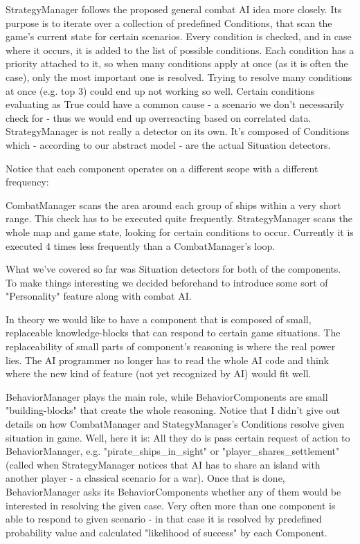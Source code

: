 StrategyManager follows the proposed general combat AI idea more closely. Its purpose is to iterate over a collection of predefined Conditions, that scan the game's current state for certain scenarios.
Every condition is checked, and in case where it occurs, it is added to the list of possible conditions.
Each condition has a priority attached to it, so when many conditions apply at once (as it is often the case), only the most important one is resolved.
Trying to resolve many conditions at once (e.g. top 3) could end up not working so well.
Certain conditions evaluating as True could have a common cause - a scenario we don't necessarily check for - thus we would end up overreacting based on correlated data.
StrategyManager is not really a detector on its own.
It's composed of Conditions which - according to our abstract model - are the actual Situation detectors.

Notice that each component operates on a different scope with a different frequency:

    CombatManager scans the area around each group of ships within a very short range. This check has to be executed quite frequently.
    StrategyManager scans the whole map and game state, looking for certain conditions to occur.
	Currently it is executed 4 times less frequently than a CombatManager's loop.

What we've covered so far was Situation detectors for both of the components.
To make things interesting we decided beforehand to introduce some sort of "Personality" feature along with combat AI.

In theory we would like to have a component that is composed of small, replaceable knowledge-blocks that can respond to certain game situations.
The replaceability of small parts of component's reasoning is where the real power lies.
The AI programmer no longer has to read the whole AI code and think where the new kind of feature (not yet recognized by AI) would fit well.

BehaviorManager plays the main role, while BehaviorComponents are small "building-blocks" that create the whole reasoning.
Notice that I didn't give out details on how CombatManager and StategyManager's Conditions resolve given situation in game.
Well, here it is: All they do is pass certain request of action to BehaviorManager, e.g. "pirate_ships_in_sight" or "player_shares_settlement" (called when StrategyManager notices that AI has to share an island with another player - a classical scenario for a war).
Once that is done, BehaviorManager asks its BehaviorComponents whether any of them would be interested in resolving the given case.
Very often more than one component is able to respond to given scenario - in that case it is resolved by predefined probability value and calculated "likelihood of success" by each Component.

